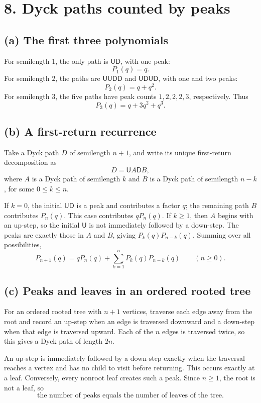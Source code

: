 \documentclass[11pt]{article}
\newcommand{\U}{\mathsf{U}}
\newcommand{\D}{\mathsf{D}}
\begin{document}
\section*{8. Dyck paths counted by peaks}

\subsection*{(a) The first three polynomials}

For semilength \(1\), the only path is \(\U\D\), with one peak:
\[
    \boxed{P_1(q)=q}.
\]
For semilength \(2\), the paths are \(\U\U\D\D\) and
\(\U\D\U\D\), with one and two peaks:
\[
    \boxed{P_2(q)=q+q^2}.
\]
For semilength \(3\), the five paths have peak counts
\(1,2,2,2,3\), respectively. Thus
\[
    \boxed{P_3(q)=q+3q^2+q^3}.
\]

\subsection*{(b) A first-return recurrence}

Take a Dyck path \(D\) of semilength \(n+1\), and write its unique
first-return decomposition as
\[
    D=\U A\D B,
\]
where \(A\) is a Dyck path of semilength \(k\) and \(B\) is a Dyck path of
semilength \(n-k\), for some \(0\leq k\leq n\).

If \(k=0\), the initial \(\U\D\) is a peak and contributes a factor \(q\);
the remaining path \(B\) contributes \(P_n(q)\). This case contributes
\(qP_n(q)\). If \(k\geq1\), then \(A\) begins with an up-step, so the initial
\(\U\) is not immediately followed by a down-step. The peaks are exactly
those in \(A\) and \(B\), giving \(P_k(q)P_{n-k}(q)\). Summing over all
possibilities,
\[
\boxed{
    P_{n+1}(q)=qP_n(q)+\sum_{k=1}^{n}P_k(q)P_{n-k}(q)
    \qquad(n\geq0).
}
\]

\subsection*{(c) Peaks and leaves in an ordered rooted tree}

For an ordered rooted tree with \(n+1\) vertices, traverse each edge away from
the root and record an up-step when an edge is traversed downward and a
down-step when that edge is traversed upward. Each of the \(n\) edges is
traversed twice, so this gives a Dyck path of length \(2n\).

An up-step is immediately followed by a down-step exactly when the traversal
reaches a vertex and has no child to visit before returning. This occurs
exactly at a leaf. Conversely, every nonroot leaf creates such a peak.
Since \(n\geq1\), the root is not a leaf, so
\[
\boxed{\text{the number of peaks equals the number of leaves of the tree}.}
\]
\end{document}

